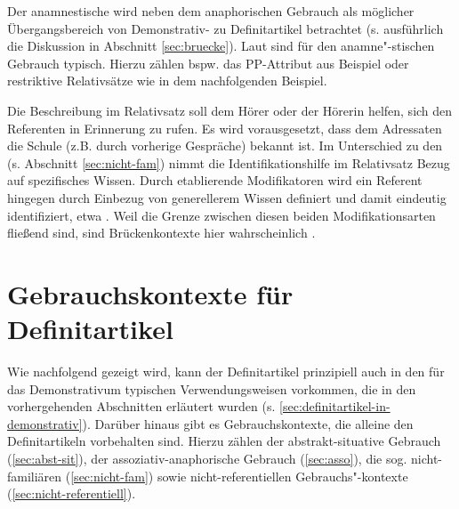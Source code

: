 \begin{exe}
	\ex \label{ex:kinder}    
\end{exe}

Der anamnestische wird neben dem anaphorischen Gebrauch als möglicher Übergangsbereich von Demonstrativ- zu Definitartikel betrachtet (s. ausführlich die Diskussion in Abschnitt \ref{sec:bruecke}). Laut \textcite[73]{Himmelmann1997} sind für den anamne"-stischen Gebrauch  typisch. Hierzu zählen bspw. das PP-Attribut  aus Beispiel  oder restriktive Relativsätze wie in dem nachfolgenden Beispiel.

\begin{exe}
	\ex \label{ex:film}     
\end{exe}
\noindent 
Die Beschreibung im Relativsatz soll dem Hörer oder der Hörerin helfen, sich den Referenten in Erinnerung zu rufen. Es wird vorausgesetzt, dass dem Adressaten die Schule (z.B. durch vorherige Gespräche) bekannt ist. Im Unterschied zu den  (s. Abschnitt \ref{sec:nicht-fam}) nimmt die Identifikationshilfe im Relativsatz Bezug auf spezifisches Wissen. Durch etablierende Modifikatoren wird ein Referent hingegen durch Einbezug von generellerem Wissen  definiert und damit eindeutig identifiziert, etwa . Weil die Grenze zwischen diesen beiden Modifikationsarten fließend sind, sind Brückenkontexte hier wahrscheinlich \parencite[s. zur ausführlichen Diskussion][79--80]{Himmelmann1997}. 

\section{Gebrauchskontexte für Definitartikel}\label{sec:definitartikel}

Wie nachfolgend gezeigt wird, kann der Definitartikel prinzipiell auch in den für das Demonstrativum typischen Verwendungsweisen vorkommen, die in den vorhergehenden Abschnitten erläutert wurden (s. \ref{sec:definitartikel-in-demonstrativ}). Darüber hinaus gibt es Gebrauchskontexte, die alleine den Definitartikeln vorbehalten sind. Hierzu zählen der abstrakt-situative Gebrauch (\ref{sec:abst-sit}), der assoziativ-anaphorische Gebrauch (\ref{sec:asso}), die sog. nicht-familiären (\ref{sec:nicht-fam}) sowie nicht-referentiellen Gebrauchs"-kontexte (\ref{sec:nicht-referentiell}). 

